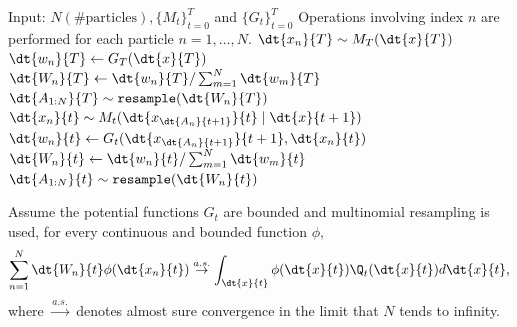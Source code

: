 \begin{algorithm}
\caption{Sequential Monte Carlo \citep[Algorithm 10.1]{chopin2020introduction}}\label{alg:FeymanKac_PF}
\begin{algorithmic}
\LineComment Input: $N (\#\mathrm{particles}),\{M_t \}_{t=0}^{T}$ and $ \{G_t \}_{t=0}^{T}$
\LineComment Operations involving index $n$ are performed for each particle $n = 1,\dots, N.$
\State $\dt{x_n}{T} \sim M_T(\dt{x}{T})$
\State $\dt{w_n}{T} \gets G_T(\dt{x}{T})$
\State $\dt{W_n}{T} \gets\dt{w_n}{T} / \sum_{m=1}^N \dt{w_m}{T}$
\State $\dt{A_{1:N}}{T} \sim \texttt{resample}(\dt{W_n}{T})$
    \State $\dt{x_n}{t} \sim M_t(\dt{x_{\dt{A_n}{t+1}}}{t}\mid \dt{x}{t+1})$
    \State $\dt{w_n}{t} \gets G_t(\dt{x_{\dt{A_n}{t+1}}}{t+1}, \dt{x_n}{t})$
    \State $\dt{W_n}{t} \gets\dt{w_n}{t} / \sum_{m=1}^N \dt{w_m}{t}$
    \State $\dt{A_{1:N}}{t} \sim \texttt{resample}(\dt{W_n}{t})$
\EndFor 
\end{algorithmic}
\end{algorithm}
\begin{theorem}\label{theorem:FeynmanKac_PF}
Assume the potential functions $G_t$ are bounded and multinomial resampling is used,
for every continuous and bounded function $\phi,$
$$
\sum_{n=1}^N \dt{W_n}{t}\phi(\dt{x_n}{t}) \overset{a.s.}{\rightarrow} \int_{\dt{x}{t}} \phi(\dt{x}{t}) \Q_t(\dt{x}{t})d\dt{x}{t},
$$
where $\overset{a.s.}{\rightarrow}$ denotes almost sure convergence in the limit that $N$ tends to infinity.
\end{theorem}
\fi 